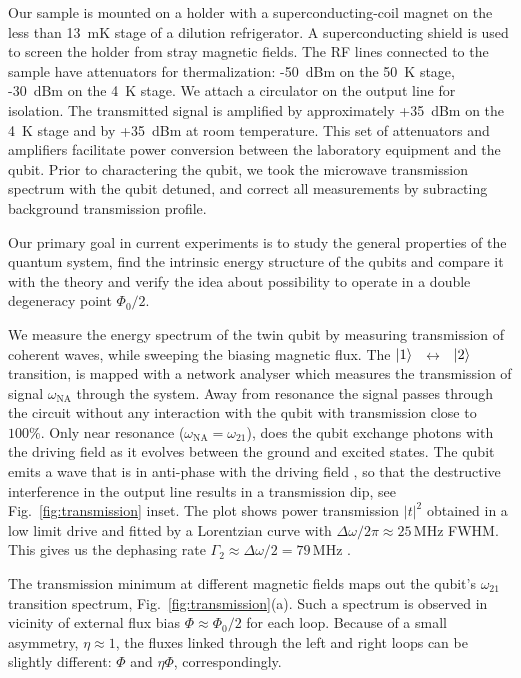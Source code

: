 \documentclass[%
reprint,
superscriptaddress,
bibnotes,
amsmath,
amssymb,
aps,
showkeys,
prb,
]{revtex4-2}
\newcommand{\iket}[1]{\ensuremath{\Ket{#1}}}
\newcommand{\ilra}{\ensuremath{\,\leftrightarrow\,}}
\begin{document}
Our sample is mounted on a holder with a superconducting-coil magnet on the less than 13~mK
stage of  a dilution refrigerator.  A  superconducting shield is used  to screen
the holder  from stray magnetic  fields.  The RF  lines connected to  the sample
have attenuators for thermalization: -50~dBm on  the 50~K stage, -30~dBm on the
4~K  stage.  We  attach a  circulator on  the output  line for  isolation.  The
transmitted signal is amplified  by approximately +35~dBm on the 4~K stage  and by +35~dBm at
room  temperature.  This  set  of attenuators  and  amplifiers facilitate  power
conversion  between the  laboratory equipment  and the qubit.  Prior  to
charactering the qubit,  we  took  the microwave  transmission
spectrum with the qubit detuned, and  correct all measurements by subracting background
transmission profile.

Our primary goal  in current experiments is to study the general properties of the quantum system, find the intrinsic energy structure
of the  qubits  and  compare it  with the  theory and verify the idea about possibility to operate in a double degeneracy point $\Phi_0/2$. 

We measure  the energy  spectrum  of the  twin qubit  by measuring transmission of coherent waves,  while  sweeping  the  biasing  magnetic flux.   
The  \iket{1}~\ilra~\iket{2}  transition, is  mapped  with a  network
analyser which measures  the transmission of signal  $\omega_{\text{NA}}$ through the
system.
Away from  resonance the signal passes through the  circuit without any
interaction with the qubit with transmission
close to  $ 100\% $.  Only near resonance  ($\omega_{\text{NA}}=\omega_{21}$), does the
qubit exchange photons  with the driving field as it  evolves between the ground
and excited states.  The  qubit emits a wave that is in anti-phase with
the driving  field \cite{Abdumalikov_2010}, so that the  destructive interference in
the output line results in  a transmission dip, see Fig.~\ref{fig:transmission} inset. The plot shows power transmission $|t|^2$ obtained in a low limit drive and fitted by a Lorentzian curve with 
$\Delta\omega/2\pi\approx25\,\text{MHz}$ FWHM. This gives us the dephasing rate $\Gamma_2 \approx \Delta\omega/2 = 79\,\text{MHz}$ 
\cite{Astafiev_2010}.  

The transmission minimum at different magnetic fields
maps   out   the   qubit's   $\omega_{21}$  transition   spectrum, Fig.~\ref{fig:transmission}(a). 
Such a spectrum is observed in vicinity of external flux bias $\Phi \approx \Phi_0/2$ for each loop. 
Because  of  a  small
asymmetry, $\eta\approx1$, the fluxes linked through  the left and right loops can be slightly
different: $ \Phi$ and $ \eta\Phi $, correspondingly.
\end{document}
